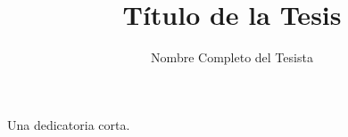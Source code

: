 \documentclass{umemoria}
\author{Nombre Completo del Tesista} %
\title{Título de la Tesis} %
\begin{document}
\frontmatter
\maketitle

\begin{resumen}
\lipsum[1-3]
\end{resumen}

\begin{abstract}
\lipsum[1-3]
\end{abstract}

\begin{dedicatoria}
Una dedicatoria corta.
\end{dedicatoria}

\begin{thanks}
\lipsum[1-2]
\end{thanks}

\tableofcontents
\listoftables %
\listoffigures %

\mainmatter







\nocite{*}



\begin{appendices}

\end{appendices}
\end{document}
